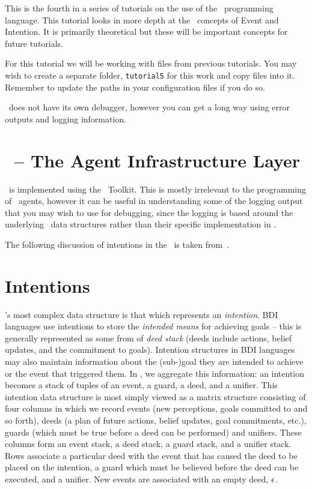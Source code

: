 
This is the fourth in a series of tutorials on the use of the \gwendolen\ programming language.  This tutorial looks in more depth at the \gwendolen\ concepts of Event and Intention.  It is primarily theoretical but these will be important concepts for future tutorials.

For this tutorial we will be working with files from previous tutorials.  You may wish to create a separate folder, \texttt{tutorial5} for this work and copy files into it.  Remember to update the paths in your configuration files if you do so.

\gwendolen\ does not have its own debugger, however you can get a long way using error outputs and logging information.

\section{\ail\ -- The Agent Infrastructure Layer}

\gwendolen\ is implemented using the \ail\ Toolkit.  This is mostly irrelevant to the programming of \gwendolen\ agents, however it can be useful in understanding some of the logging output that you may wish to use for debugging, since the logging is based around the underlying \java\ data structures rather than their specific implementation in \gwendolen.

The following discussion of intentions in the \ail\ is taken from~\cite{springerlink:10.1007/s10515-011-0088-x}.

\section{Intentions}

\ail's most complex data structure is that which represents an
\emph{intention}.  BDI languages use intentions to
store the \emph{intended means} for achieving goals -- this is
generally represented as some from of {\em deed stack} (deeds include
actions, belief updates, and the commitment to
goals).  Intention structures in BDI languages may
also maintain information about the (sub-)goal they are intended to
achieve or the event that triggered them. In \ail, we aggregate
this information: an intention becomes a stack of tuples of an
event, a guard, a deed, and a
unifier.  This \ail{} intention data structure is most
simply viewed as a matrix structure consisting of four columns in
which we record events (new perceptions, goals committed to and so
forth), deeds (a plan of future actions, belief updates, goal
commitments, etc.), guards (which must be true before a deed can be
performed) and unifiers. These columns form an event stack, a deed
stack, a guard stack, and a unifier stack.  Rows associate a
particular deed with the event that has caused the deed to be placed
on the intention, a guard which must be believed before the deed can
be executed, and a unifier. New events are associated with an empty
deed, $\AILnpy$\index{$\AILnpy$}.

